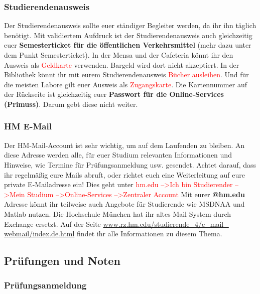 \subsubsection{Studierendenausweis}

Der Studierendenausweis sollte euer ständiger Begleiter werden, da ihr ihn täglich benötigt. Mit validiertem Aufdruck ist der Studierendenausweis auch gleichzeitig euer \textbf{Semesterticket für die öffentlichen Verkehrsmittel} (mehr dazu unter dem Punkt \glqq Semesterticket\grqq{}). In der Mensa und der Cafeteria könnt ihr den Ausweis als \textcolor{red}{Geldkarte} verwenden. Bargeld wird dort nicht akzeptiert. In der Bibliothek könnt ihr mit eurem Studierendenausweis \textcolor{red}{Bücher ausleihen}. Und für die meisten Labore gilt euer Ausweis als \textcolor{red}{Zugangskarte}. Die Kartennummer auf der Rückseite ist gleichzeitig euer \textbf{Passwort für die Online-Services (Primuss)}. Darum gebt diese nicht weiter.

\subsubsection{HM E-Mail}

Der HM-Mail-Account ist sehr wichtig, um auf dem Laufenden zu bleiben. An diese Adresse werden alle, für euer Studium relevanten Informationen und Hinweise, wie Termine für Prüfungsanmeldung usw. gesendet. Achtet darauf, dass ihr regelmäßig eure Mails abruft, oder richtet euch eine Weiterleitung auf eure private E-Mailadresse ein!\doublebreak
Dies geht unter \textcolor{red}{hm.edu --\textgreater Ich bin Studierender --\textgreater Mein Studium --\textgreater Online-Services --\textgreater Zentraler Account}\doublebreak
Mit eurer  \textbf{@hm.edu}  Adresse könnt ihr teilweise auch Angebote für Studierende wie MSDNAA und Matlab nutzen.\doublebreak
Die Hochschule München hat ihr altes Mail System durch Exchange ersetzt. Auf der Seite \url{www.rz.hm.edu/studierende_4/e_mail_}\\ \url{webmail/index.de.html} findet ihr alle Informationen zu diesem Thema.

\subsection{Prüfungen und Noten}
\subsubsection{Prüfungsanmeldung}

